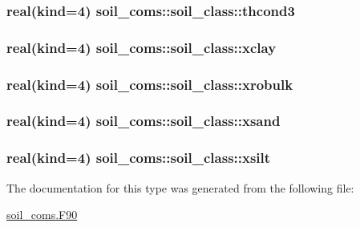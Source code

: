 \subsubsection[{\texorpdfstring{thcond3}{thcond3}}]{\setlength{\rightskip}{0pt plus 5cm}real(kind=4) soil\+\_\+coms\+::soil\+\_\+class\+::thcond3}\hypertarget{structsoil__coms_1_1soil__class_a397cf750d8da66afa2bbe2852710fb96}{}\label{structsoil__coms_1_1soil__class_a397cf750d8da66afa2bbe2852710fb96}
\subsubsection[{\texorpdfstring{xclay}{xclay}}]{\setlength{\rightskip}{0pt plus 5cm}real(kind=4) soil\+\_\+coms\+::soil\+\_\+class\+::xclay}\hypertarget{structsoil__coms_1_1soil__class_aceee9b2a612e85b8853246b03a03a438}{}\label{structsoil__coms_1_1soil__class_aceee9b2a612e85b8853246b03a03a438}
\subsubsection[{\texorpdfstring{xrobulk}{xrobulk}}]{\setlength{\rightskip}{0pt plus 5cm}real(kind=4) soil\+\_\+coms\+::soil\+\_\+class\+::xrobulk}\hypertarget{structsoil__coms_1_1soil__class_a280114239df2814bcb3a49428719dba7}{}\label{structsoil__coms_1_1soil__class_a280114239df2814bcb3a49428719dba7}
\subsubsection[{\texorpdfstring{xsand}{xsand}}]{\setlength{\rightskip}{0pt plus 5cm}real(kind=4) soil\+\_\+coms\+::soil\+\_\+class\+::xsand}\hypertarget{structsoil__coms_1_1soil__class_a3dec357296a1dd2bc95b3e0561048c9f}{}\label{structsoil__coms_1_1soil__class_a3dec357296a1dd2bc95b3e0561048c9f}
\subsubsection[{\texorpdfstring{xsilt}{xsilt}}]{\setlength{\rightskip}{0pt plus 5cm}real(kind=4) soil\+\_\+coms\+::soil\+\_\+class\+::xsilt}\hypertarget{structsoil__coms_1_1soil__class_a12d1d7cdc5452e72225e5b79a1188a02}{}\label{structsoil__coms_1_1soil__class_a12d1d7cdc5452e72225e5b79a1188a02}


The documentation for this type was generated from the following file\+:\begin{DoxyCompactItemize}
\item 
\hyperlink{soil__coms_8_f90}{soil\+\_\+coms.\+F90}\end{DoxyCompactItemize}
